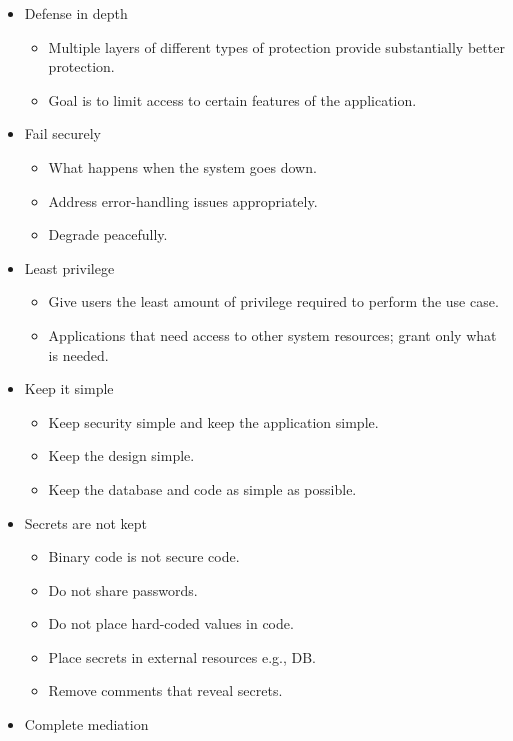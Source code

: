 \documentclass[a4paper]{article}
\begin{document}
\begin{enumerate}
\begin{itemize}
\begin{itemize}
					\end{itemize}
				\item Defense in depth
					\begin{itemize}
						\item Multiple layers of different types of protection
							provide substantially better protection.
						\item Goal is to limit access to certain features of
							the application.
					\end{itemize}
				\item Fail securely
					\begin{itemize}
						\item What happens when the system goes down.
						\item Address error-handling issues appropriately.
						\item Degrade peacefully.
					\end{itemize}
				\item Least privilege
					\begin{itemize}
						\item Give users the least amount of privilege required
							to perform the use case.
						\item Applications that need access to other system
							resources; grant only what is needed.
					\end{itemize}
				\item Keep it simple
					\begin{itemize}
						\item Keep security simple and keep the application simple.
						\item Keep the design simple.
						\item Keep the database and code as simple as possible.
					\end{itemize}
				\item Secrets are not kept
					\begin{itemize}
						\item Binary code is not secure code.
						\item Do not share passwords.
						\item Do not place hard-coded values in code.
						\item Place secrets in external resources e.g., DB.
						\item Remove comments that reveal secrets.
					\end{itemize}
				\item Complete mediation
					\begin{itemize}

\end{itemize}
\end{itemize}
\end{enumerate}
\end{document}
